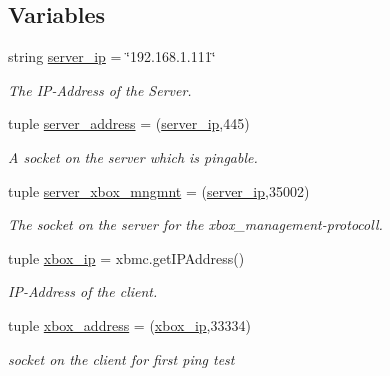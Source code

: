 \subsection*{Variables}
\begin{DoxyCompactItemize}
\item 
string \hyperlink{namespaceshutdown_a1d57ccf41aa815c697b5e7462788d6ef}{server\_\-ip} = \char`\"{}192.168.1.111\char`\"{}
\begin{DoxyCompactList}\small\item\em The IP-\/Address of the Server. \item\end{DoxyCompactList}\item 
tuple \hyperlink{namespaceshutdown_a06cedfd6f90aae704fb783a7c26d5766}{server\_\-address} = (\hyperlink{namespaceshutdown_a1d57ccf41aa815c697b5e7462788d6ef}{server\_\-ip},445)
\begin{DoxyCompactList}\small\item\em A socket on the server which is pingable. \item\end{DoxyCompactList}\item 
tuple \hyperlink{namespaceshutdown_acbd52c2f88522e549aae89f6cc542155}{server\_\-xbox\_\-mngmnt} = (\hyperlink{namespaceshutdown_a1d57ccf41aa815c697b5e7462788d6ef}{server\_\-ip},35002)
\begin{DoxyCompactList}\small\item\em The socket on the server for the xbox\_\-management-\/protocoll. \item\end{DoxyCompactList}\item 
tuple \hyperlink{namespaceshutdown_a46841de53247fce3f5dcbf4ab5ecdfcc}{xbox\_\-ip} = xbmc.getIPAddress()
\begin{DoxyCompactList}\small\item\em IP-\/Address of the client. \item\end{DoxyCompactList}\item 
tuple \hyperlink{namespaceshutdown_a13b0427c044e6d8765191d9e858ff627}{xbox\_\-address} = (\hyperlink{namespaceshutdown_a46841de53247fce3f5dcbf4ab5ecdfcc}{xbox\_\-ip},33334)
\begin{DoxyCompactList}\small\item\em socket on the client for first ping test \item\end{DoxyCompactList}\item 

\end{DoxyCompactItemize}
